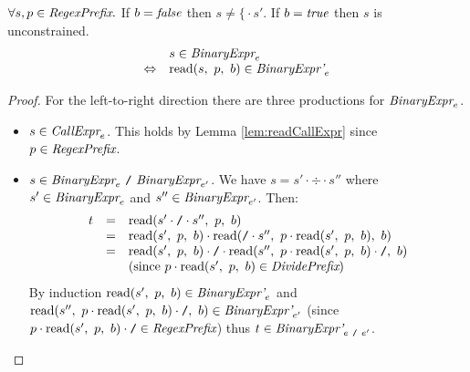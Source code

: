 \documentclass[preprint,10pt]{sigplanconf}
\begin{document}
\begin{lemma}\mbox{}
  
  \( \forall s, p \in \textit{RegexPrefix}. \)
  If \( b = \textit{false} \) then \( s \not = \texttt{\{} \cdot s' \). If \(
  b = \textit{true} \) then \( s \) is unconstrained.
  \[
  \begin{array}{rl}
  &s \in \textit{BinaryExpr}_{e} 
  \\
  \Leftrightarrow &
  \textrm{read}(s,~p,~b) \in \textit{BinaryExpr'}_{e} 
  \end{array}
  \]

\end{lemma}
\begin{proof}
  For the left-to-right direction there are three productions for
  \( \textit{BinaryExpr}_{e} \).
  \begin{itemize}
  \item \( s \in \textit{CallExpr}_{e} \). This holds by Lemma
    \ref{lem:readCallExpr} since \( p \in \textit{RegexPrefix} \).

  \item \( s \in \textit{BinaryExpr}_{e} ~\texttt{/}~ \textit{BinaryExpr}_{e'}
    \). We have \( s = s' \cdot \div \cdot s'' \) where \( s' \in
    \textit{BinaryExpr}_{e} \) and \( s'' \in \textit{BinaryExpr}_{e'} \).
    Then:
    \[
    \begin{array}{rcl}
      t &=& \textrm{read}(s'\cdot \texttt{/} \cdot s'',~p,~b)
      \\
      &=& 
      \textrm{read}(s',~p,~b) \cdot 
      \textrm{read}(\texttt{/} \cdot s'',~
        p \cdot \textrm{read}(s',~p,~b)
      ,~b)
      \\
      &=& \textrm{read}(s',~p,~b) \cdot \texttt{/} \cdot 
      \textrm{read}(s'',~
        p \cdot \textrm{read}(s',~p,~b) \cdot \texttt{/}
      ,~b)
      \\ 
      && \textrm{(since \( p \cdot \textrm{read}(s',~p,~b) \in \textit{DividePrefix}\))}
    \end{array}
    \]
    By induction \( \textrm{read}(s',~p,~b) \in \textit{BinaryExpr'}_{e} \)
    and \( 
      \textrm{read}(s'',~
        p \cdot \textrm{read}(s',~p,~b) \cdot \texttt{/}
      ,~b) \in \textit{BinaryExpr'}_{e'}
      \) (since \( p \cdot \textrm{read}(s',~p,~b) \cdot \texttt{/} \in \textit{RegexPrefix} \)) thus \( t \in \textit{BinaryExpr'}_{e~\texttt{/}~e'} \).


\end{itemize}
\end{proof}
\end{document}
